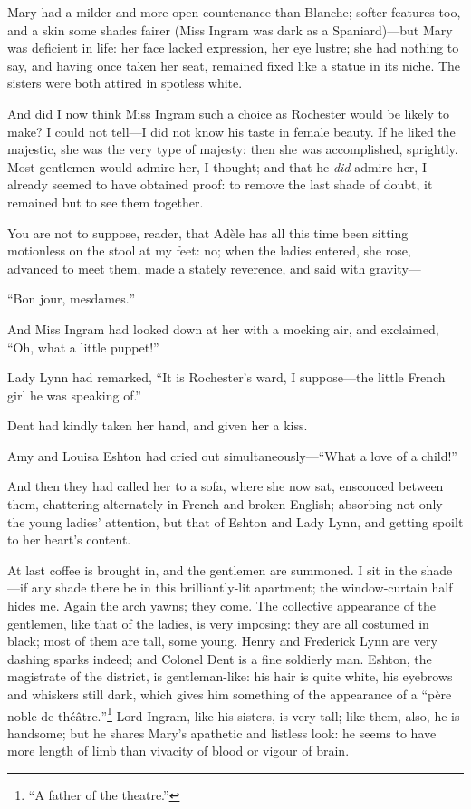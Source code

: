 Mary had a milder and more open countenance than Blanche; softer
features too, and a skin some shades fairer (Miss Ingram was dark as a
Spaniard)---but Mary was deficient in life: her face lacked expression,
her eye lustre; she had nothing to say, and having once taken her seat,
remained fixed like a statue in its niche. The sisters were both
attired in spotless white.

And did I now think Miss Ingram such a choice as \Mr{} Rochester would be
likely to make? I could not tell---I did not know his taste in female
beauty. If he liked the majestic, she was the very type of majesty:
then she was accomplished, sprightly. Most gentlemen would admire her,
I thought; and that he \emph{did} admire her, I already seemed to have
obtained proof: to remove the last shade of doubt, it remained but to
see them together.

You are not to suppose, reader, that Adèle has all this time been
sitting motionless on the stool at my feet: no; when the ladies entered,
she rose, advanced to meet them, made a stately reverence, and said with
gravity---

\foreignquote{french}{Bon jour, mesdames.}

And Miss Ingram had looked down at her with a mocking air, and
exclaimed, \enquote{Oh, what a little puppet!}

Lady Lynn had remarked, \enquote{It is \Mr{} Rochester's ward, I
	suppose---the little French girl he was speaking of.}

\Mrs{} Dent had kindly taken her hand, and given her a kiss.

Amy and Louisa Eshton had cried out simultaneously---\enquote{What a
	love of a child!}

And then they had called her to a sofa, where she now sat, ensconced
between them, chattering alternately in French and broken English;
absorbing not only the young ladies' attention, but that of \Mrs{} Eshton
and Lady Lynn, and getting spoilt to her heart's content.

At last coffee is brought in, and the gentlemen are summoned. I sit in
the shade---if any shade there be in this brilliantly-lit apartment; the
window-curtain half hides me. Again the arch yawns; they come. The
collective appearance of the gentlemen, like that of the ladies, is very
imposing: they are all costumed in black; most of them are tall, some
young. Henry and Frederick Lynn are very dashing sparks indeed; and
Colonel Dent is a fine soldierly man. \Mr{} Eshton, the magistrate of the
district, is gentleman-like: his hair is quite white, his eyebrows and
whiskers still dark, which gives him something of the appearance of a
\foreignquote{french}{père noble de théâtre.}\footnote{
	\enquote{A father of the theatre.}} Lord Ingram, like his sisters, is very
tall; like them, also, he is handsome; but he shares Mary's apathetic
and listless look: he seems to have more length of limb than vivacity of
blood or vigour of brain.

